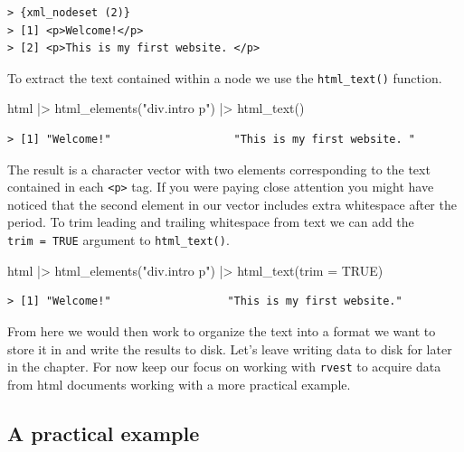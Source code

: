 \documentclass[
  letterpaper,
]{latex/krantz}
\newenvironment{Shaded}{\begin{snugshade}}{\end{snugshade}}
\newcommand{\AttributeTok}[1]{\textcolor[rgb]{0.00,0.00,0.00}{#1}}
\newcommand{\ConstantTok}[1]{\textcolor[rgb]{0.00,0.00,0.00}{#1}}
\newcommand{\FunctionTok}[1]{\textcolor[rgb]{0.00,0.00,0.00}{#1}}
\newcommand{\NormalTok}[1]{\textcolor[rgb]{0.00,0.00,0.00}{#1}}
\newcommand{\SpecialCharTok}[1]{\textcolor[rgb]{0.00,0.00,0.00}{#1}}
\newcommand{\StringTok}[1]{\textcolor[rgb]{0.00,0.00,0.00}{#1}}
\begin{document}
\begin{verbatim}
> {xml_nodeset (2)}
> [1] <p>Welcome!</p>
> [2] <p>This is my first website. </p>
\end{verbatim}

To extract the text contained within a node we use the
\texttt{html\_text()} function.

\begin{Shaded}
\begin{Highlighting}[]
\NormalTok{html }\SpecialCharTok{|\textgreater{}} 
  \FunctionTok{html\_elements}\NormalTok{(}\StringTok{"div.intro p"}\NormalTok{) }\SpecialCharTok{|\textgreater{}} 
  \FunctionTok{html\_text}\NormalTok{()}
\end{Highlighting}
\end{Shaded}

\begin{verbatim}
> [1] "Welcome!"                   "This is my first website. "
\end{verbatim}

The result is a character vector with two elements corresponding to the
text contained in each \texttt{\textless{}p\textgreater{}} tag. If you
were paying close attention you might have noticed that the second
element in our vector includes extra whitespace after the period. To
trim leading and trailing whitespace from text we can add the
\texttt{trim\ =\ TRUE} argument to \texttt{html\_text()}.

\begin{Shaded}
\begin{Highlighting}[]
\NormalTok{html }\SpecialCharTok{|\textgreater{}} 
  \FunctionTok{html\_elements}\NormalTok{(}\StringTok{"div.intro p"}\NormalTok{) }\SpecialCharTok{|\textgreater{}} 
  \FunctionTok{html\_text}\NormalTok{(}\AttributeTok{trim =} \ConstantTok{TRUE}\NormalTok{)}
\end{Highlighting}
\end{Shaded}

\begin{verbatim}
> [1] "Welcome!"                  "This is my first website."
\end{verbatim}

From here we would then work to organize the text into a format we want
to store it in and write the results to disk. Let's leave writing data
to disk for later in the chapter. For now keep our focus on working with
\texttt{rvest} to acquire data from html documents working with a more
practical example.

\hypertarget{a-practical-example}{%
\subsection{A practical example}\label{a-practical-example}}
\end{document}
